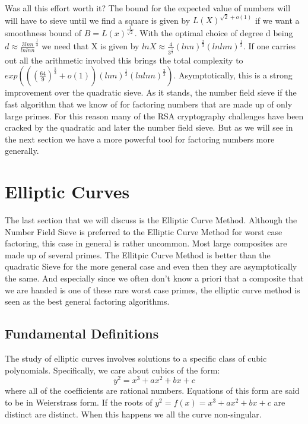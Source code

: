 \documentclass{article}
\begin{document}
Was all this effort worth it? The bound for the expected value of numbers will will have to sieve until we find a square is given by $L(X)^{\sqrt{2} + o(1)}$ if we want a smoothness bound of $B = L(x)^{\frac{1}{\sqrt{2}}}$\cite{Pomma1996}. With the optimal choice of degree d being $d \approx \frac{3 ln n}{ln ln n}^\frac{1}{3}$ we need that X is given by $ln X \approx \frac{4}{3^{\frac{1}{3}}} (ln n)^{\frac{2}{3}} ( ln ln n)^\frac{1}{3}$. If one carries out all the arithmetic involved this brings the total complexity to $exp ( ( ( \frac{64}{9})^\frac{1}{3} + o(1)) ( ln n)^{\frac{1}{3}} ( ln ln n)^\frac{2}{3})$. Asymptotically, this is a strong improvement over the quadratic sieve. As it stands, the number field sieve if the fast algorithm that we know of for factoring numbers that are made up of only large primes. For this reason many of the RSA cryptography challenges have been cracked by the quadratic and later the number field sieve. But as we will see in the next section we have a more powerful tool for factoring numbers more generally. 

\section{Elliptic Curves}

The last section that we will discuss is the Elliptic Curve Method. Although the Number Field Sieve is preferred to the Elliptic Curve Method for worst case factoring, this case in general is rather uncommon. Most large composites are made up of several primes. The Ellitpic Curve Method is better than the quadratic Sieve for the more general case and even then they are asymptotically the same. And especially since we often don't know a priori that a composite that we are handed is one of these rare worst case primes, the elliptic curve method is seen as the best general factoring algorithms. 

\subsection{Fundamental Definitions}

The study of elliptic curves involves solutions to a specific class of cubic polynomials. Specifically, we care about cubics of the form: \begin{equation}
    y^2 = x^3 + ax^2 + bx + c 
\end{equation}
where all of the coefficients are rational numbers.  Equations of this form are said to be in Weierstrass form. If the roots of $y^2 = f(x) = x^3 +  ax^2 + bx + c$ are distinct are distinct. When this happens we all the curve non-singular. 
\end{document}
